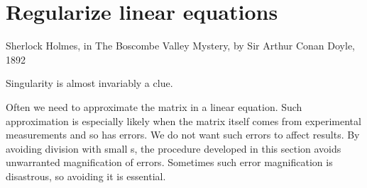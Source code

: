 

\section{Regularize linear equations}
\label{sec:rle}
\secttoc
{}

\begin{quoted}{\parbox[t]{15em}{Sherlock Holmes, in The Boscombe Valley Mystery, by Sir Arthur Conan Doyle, 1892}}
Singularity is almost invariably a clue.
\end{quoted}


Often we need to approximate the matrix in a linear equation.  
Such approximation is especially likely when the matrix itself comes from experimental measurements and so has errors.
We do not want such errors to affect results.
By avoiding division with small s, the procedure developed in this section avoids unwarranted magnification of errors.
Sometimes such error magnification is disastrous, so avoiding it is essential.

